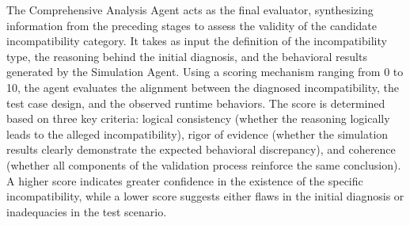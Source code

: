 The Comprehensive Analysis Agent acts as the final evaluator, synthesizing information from the preceding stages to assess the validity of the candidate incompatibility category. It takes as input the definition of the incompatibility type, the reasoning behind the initial diagnosis, and the behavioral results generated by the Simulation Agent. Using a scoring mechanism ranging from 0 to 10, the agent evaluates the alignment between the diagnosed incompatibility, the test case design, and the observed runtime behaviors. The score is determined based on three key criteria: logical consistency (whether the reasoning logically leads to the alleged incompatibility), rigor of evidence (whether the simulation results clearly demonstrate the expected behavioral discrepancy), and coherence (whether all components of the validation process reinforce the same conclusion). A higher score indicates greater confidence in the existence of the specific incompatibility, while a lower score suggests either flaws in the initial diagnosis or inadequacies in the test scenario.





